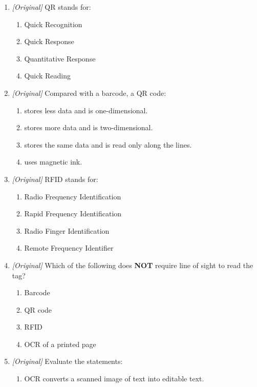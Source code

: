 \begin{enumerate}[label=\textbf{Q\arabic*.}, leftmargin=*]
\begin{enumerate}[label=\Alph*.]
    \item Barcode
    \item RFID tag
    \item MICR line
  \end{enumerate}
\item \textit{[Original]} QR stands for:
  \begin{enumerate}[label=\Alph*.]
    \item Quick Recognition
    \item Quick Response
    \item Quantitative Response
    \item Quick Reading
  \end{enumerate}
\item \textit{[Original]} Compared with a barcode, a QR code:
  \begin{enumerate}[label=\Alph*.]
    \item stores less data and is one-dimensional.
    \item stores more data and is two-dimensional.
    \item stores the same data and is read only along the lines.
    \item uses magnetic ink.
  \end{enumerate}
\item \textit{[Original]} RFID stands for:
  \begin{enumerate}[label=\Alph*.]
    \item Radio Frequency Identification
    \item Rapid Frequency Identification
    \item Radio Finger Identification
    \item Remote Frequency Identifier
  \end{enumerate}
\item \textit{[Original]} Which of the following does \textbf{NOT} require
  line of sight to read the tag?
  \begin{enumerate}[label=\Alph*.]
    \item Barcode
    \item QR code
    \item RFID
    \item OCR of a printed page
  \end{enumerate}
\item \textit{[Original]} Evaluate the statements:
  \begin{enumerate}[label=\Roman*.]
    \item OCR converts a scanned image of text into editable text.

\end{enumerate}
\end{enumerate}
